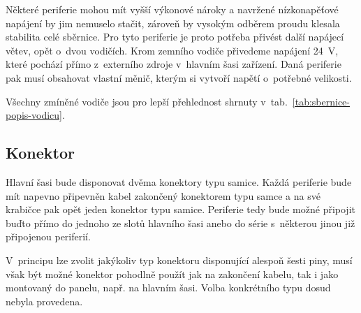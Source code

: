         Některé periferie mohou mít vyšší výkonové nároky a navržené nízkonapěťové napájení by jim nemuselo stačit, zároveň by vysokým odběrem proudu klesala stabilita celé sběrnice. Pro tyto periferie je proto potřeba přivést další napájecí větev, opět o~dvou vodičích. Krom zemního vodiče přivedeme napájení \qty{24}{V}, které pochází přímo z~externího zdroje v~hlavním šasi zařízení. Daná periferie pak musí obsahovat vlastní měnič, kterým si vytvoří napětí o~potřebné velikosti. 

        Všechny zmíněné vodiče jsou pro lepší přehlednost shrnuty v~tab.~\ref{tab:sbernice-popis-vodicu}.
    
    \subsection{Konektor}
        Hlavní šasi bude disponovat dvěma konektory typu samice. Každá periferie bude mít napevno připevněn kabel zakončený konektorem typu samce a na své krabičce pak opět jeden konektor typu samice. Periferie tedy bude možné připojit buďto přímo do jednoho ze slotů hlavního šasi anebo do série s~některou jinou již připojenou periferií. 

        V~principu lze zvolit jakýkoliv typ konektoru disponující alespoň šesti piny, musí však být možné konektor pohodlně použít jak na zakončení kabelu, tak i jako montovaný do panelu, např. na hlavním šasi. Volba konkrétního typu dosud nebyla provedena.

